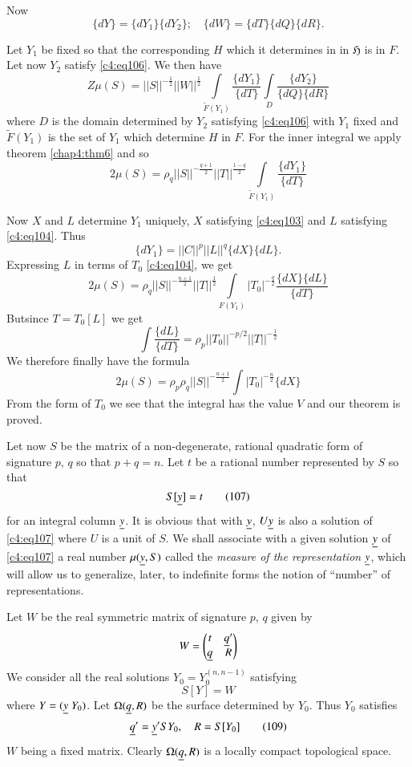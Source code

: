 Now
$$
\{dY\}=\{dY_{1}\}\{dY_{2}\};\quad \{dW\}=\{dT\}\{dQ\}\{dR\}.
$$

Let $Y_{1}$ be fixed so that the corresponding $H$ which it determines
in in $\mathfrak{H}$ is in $F$. Let now $Y_{2}$ satisfy
\eqref{c4:eq106}. We then have
$$
Z\mu
(S)=||S||^{-\frac{1}{2}} ||W||^{\frac{1}{2}} \int\limits_{\tilde{F}(Y_{1})}
\frac{\{dY_{1}\}}{\{dT\}} \int\limits_{D}
\frac{\{dY_{2}\}}{\{dQ\}\{dR\}}   
$$
where $D$ is the domain determined by $Y_{2}$ satisfying \eqref{c4:eq106}
with $Y_{1}$ fixed and $\widetilde{F}(Y_{1})$ is the set of $Y_{1}$
which determine $H$ in $F$. For the inner integral we apply theorem
\ref{chap4:thm6} and so
$$
2\mu(S)=\rho_{q}||S||^{-\frac{q+1}{2}}||T||^{\frac{1-q}{2}}\int\limits_{\widetilde{F}(Y_{1})}\frac{\{dY_{1}\}}{\{dT\}} 
$$

Now $X$ and $L$ determine $Y_{1}$ uniquely, $X$ satisfying \eqref{c4:eq103}
and $L$ satisfying \eqref{c4:eq104}. Thus 
$$
\{dY_{1}\}=||C||^{p}||L||^{q}\{dX\}\{dL\}.
$$
Expressing $L$ in terms of $T_{0}$ \eqref{c4:eq104}, we get
$$
2\mu
(S)=\rho_{q}||S||^{-\frac{n+1}{2}}||T||^{\frac{1}{2}}\int\limits_{F(Y_{1})}|T_{0}|^{-\frac{q}{2}}\frac{\{dX\}\{dL\}}{\{dT\}} 
$$
But\pageoriginale since $T=T_{0}[L]$ we get
$$
\int\frac{\{dL\}}{\{dT\}}=\rho_{p}||T_{0}||^{-p/2}||T||^{-\frac{1}{2}}
$$
We therefore finally have the formula
$$
2\mu (S)=\rho_{p}\rho_{q}||S||^{-\frac{n+1}{2}}\int
|T_{0}|^{-\frac{n}{2}}\{dX\}
$$
From the form of $T_{0}$ we see that the integral has the value $V$
and our theorem is proved.

Let now $S$ be the matrix of a non-degenerate, rational quadratic form
of signature $p$, $q$ so that $p+q=n$. Let $t$ be a rational number
represented by $S$ so that
\begin{equation*}
S[\underline{y}]=t\tag{107}\label{c4:eq107}
\end{equation*}
for an integral column $\underline{y}$. It is obvious that with $\underline{y}$,
$U\underline{y}$ is also a solution of \eqref{c4:eq107} where $U$ is a unit of
$S$. We shall associate with a given solution $\underline{y}$ of \eqref{c4:eq107}
a real number $\mu(\underline{y},S)$ called the {\em measure of the
  representation} $\underline{y}$, which will allow us to generalize, later,
to indefinite forms the notion of ``number'' of representations.

Let $W$ be the real symmetric matrix of signature $p$, $q$ given by
$$
W=
\begin{pmatrix}
t & \underline{q}'\\
\underline{q} & R
\end{pmatrix}
$$
We consider all the real solutions $Y_{0}=Y_{0}^{(n,n-1)}$ satisfying 
\begin{equation*}
S[Y]=W\tag{108}\label{c4:eq108}
\end{equation*}
where $Y=(\underline{y} \; Y_{0})$. Let $\Omega(\underline{q},R)$ be the surface
determined by $Y_{0}$. Thus $Y_{0}$ satisfies 
\begin{equation*}
\underline{q}'=\underline{y}'SY_{0},\quad R=S[Y_{0}]\tag{109}\label{c4:eq109}
\end{equation*}\pageoriginale
$W$ being a fixed matrix. Clearly $\Omega(\underline{q},R)$ is a locally
compact topological space.


